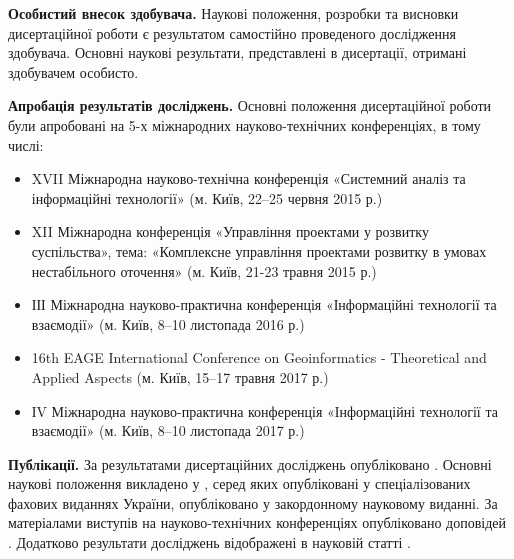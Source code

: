 \textbf{Особистий внесок здобувача.} Наукові положення, розробки та висновки дисертаційної роботи є результатом самостійно проведеного дослідження здобувача. Основні наукові результати, представлені в дисертації, отримані здобувачем особисто.

\textbf{Апробація результатів досліджень.} Основні положення дисертаційної роботи були апробовані на 5-х міжнародних науково-технічних конференціях, в тому числі:

\begin{itemize}
	\item XVII Міжнародна науково-технічна конференція «Системний аналіз та інформаційні технології» (м. Київ, 22--25 червня 2015 р.)
	\item XII Міжнародна конференція «Управління проектами у розвитку суспільства», тема: «Комплексне управління проектами розвитку в умовах нестабільного оточення» (м. Київ, 21-23 травня 2015 р.)
	\item ІІІ Міжнародна науково-практична конференція «Інформаційні технології та взаємодії» (м. Київ, 8--10 листопада 2016 р.)
	\item 16th EAGE International Conference on Geoinformatics - Theoretical and Applied Aspects (м. Київ, 15--17 травня 2017 р.)
	\item ІV Міжнародна науково-практична конференція «Інформаційні технології та взаємодії» (м. Київ, 8--10 листопада 2017 р.)
\end{itemize}

\printbibliography[heading=countauthor, env=countauthor, keyword=biblioauthor, section=1]%
\printbibliography[heading=countauthorvak, env=countauthorvak, keyword=biblioauthorvak, section=1]%
\printbibliography[heading=countauthorconf, env=countauthorconf, keyword=biblioauthorconf, section=1]%

\textbf{Публікації.} 
За результатами дисертаційних досліджень опубліковано
. 
Основні наукові положення викладено у 
 \cite{art2,art3,art4,art5,art8},
серед яких \cite{art2,art3,art4,art5} опубліковані у спеціалізованих фахових виданнях України, 
\cite{art8} опубліковано у закордонному науковому виданні. 
За матеріалами виступів на науково-технічних конференціях опубліковано 
 доповідей \cite{conf5,conf6,conf8,conf9,conf10}.
Додатково результати досліджень відображені в науковій статті \cite{art1}.

\printbibliography[heading=countauthor, env=countauthor, keyword=biblioauthor]%

